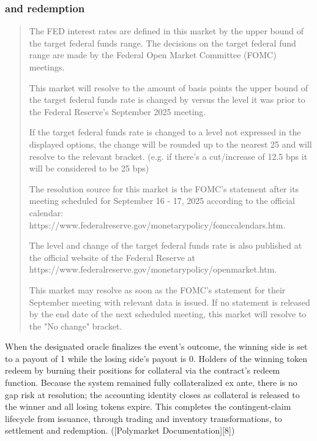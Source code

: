 \subsubsection{and redemption}



\begin{quote}
  {
    \raggedright
    The FED interest rates are defined in this market by the upper bound of the target federal funds range. The decisions on the target federal fund range are made by the Federal Open Market Committee (FOMC) meetings.

    This market will resolve to the amount of basis points the upper bound of the target federal funds rate is changed by versus the level it was prior to the Federal Reserve's September 2025 meeting.

    If the target federal funds rate is changed to a level not expressed in the displayed options, the change will be rounded up to the nearest 25 and will resolve to the relevant bracket. (e.g. if there's a cut/increase of 12.5 bps it will be considered to be 25 bps)

    The resolution source for this market is the FOMC’s statement after its meeting scheduled for September 16 - 17, 2025 according to the official calendar:
    https://www.federalreserve.gov/monetarypolicy/fomccalendars.htm.

    The level and change of the target federal funds rate is also published at the official website of the Federal Reserve at
    https://www.federalreserve.gov/monetarypolicy/openmarket.htm.

    This market may resolve as soon as the FOMC’s statement for their September meeting with relevant data is issued. If no statement is released by the end date of the next scheduled meeting, this market will resolve to the "No change" bracket. 
  }
\end{quote}

When the designated oracle finalizes the event’s outcome, the winning side is set to a payout of 1 while the losing side’s payout is 0. Holders of the winning token redeem by burning their positions for collateral via the contract’s redeem function. Because the system remained fully collateralized ex ante, there is no gap risk at resolution; the accounting identity closes as collateral is released to the winner and all losing tokens expire. This completes the contingent-claim lifecycle from issuance, through trading and inventory transformations, to settlement and redemption. ([Polymarket Documentation][8])



